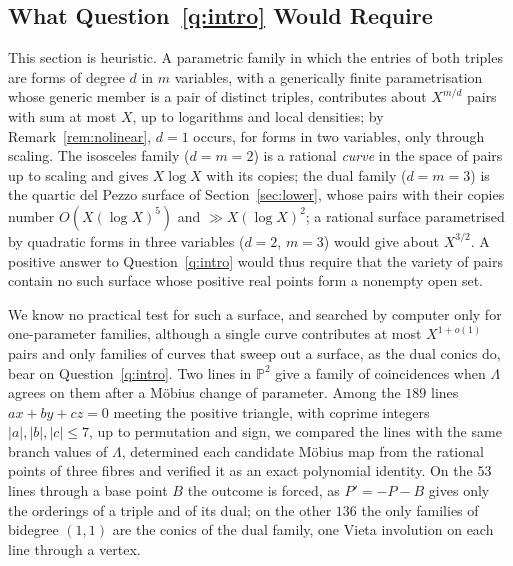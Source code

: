 \documentclass[10pt]{article}
\newcommand{\PP}{\mathbb{P}}
\begin{document}
\subsection{What Question~\ref{q:intro} Would Require}\label{sec:heuristic}

This section is heuristic. A parametric family in which the entries of both triples are forms of degree $d$ in $m$ variables, with a generically finite parametrisation whose generic member is a pair of distinct triples, contributes about $X^{m/d}$ pairs with sum at most $X$, up to logarithms and local densities; by Remark~\ref{rem:nolinear}, $d=1$ occurs, for forms in two variables, only through scaling. The isosceles family ($d=m=2$) is a rational \emph{curve} in the space of pairs up to scaling and gives $X\log X$ with its copies; the dual family ($d=m=3$) is the quartic del Pezzo surface of Section~\ref{sec:lower}, whose pairs with their copies number $O(X(\log X)^5)$ and $\gg X(\log X)^2$; a rational surface parametrised by quadratic forms in three variables ($d=2$, $m=3$) would give about $X^{3/2}$. A positive answer to Question~\ref{q:intro} would thus require that the variety of pairs contain no such surface whose positive real points form a nonempty open set.

We know no practical test for such a surface, and searched by computer only for one-parameter families, although a single curve contributes at most $X^{1+o(1)}$ pairs and only families of curves that sweep out a surface, as the dual conics do, bear on Question~\ref{q:intro}. Two lines in $\PP^2$ give a family of coincidences when $\Lambda$ agrees on them after a M\"obius change of parameter. Among the $189$ lines $ax+by+cz=0$ meeting the positive triangle, with coprime integers $|a|,|b|,|c|\le7$, up to permutation and sign, we compared the lines with the same branch values of $\Lambda$, determined each candidate M\"obius map from the rational points of three fibres and verified it as an exact polynomial identity. On the $53$ lines through a base point $B$ the outcome is forced, as $P'=-P-B$ gives only the orderings of a triple and of its dual; on the other $136$ the only families of bidegree $(1,1)$ are the conics of the dual family, one Vieta involution on each line through a vertex.
\end{document}
